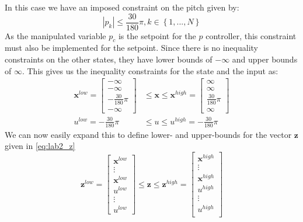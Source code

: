 \documentclass[../main.tex]{subfiles}
\begin{document}
In this case we have an imposed constraint on the pitch given by:
\begin{equation}
	\left\lvert p_k \right\rvert \le \frac{30}{180} \pi, k \in \left\{ 1, ..., N \right\} 
\end{equation}
As the manipulated variable $ p_c $ is the setpoint for the $ p $ controller, this constraint must also be implemented for the setpoint. Since there is no inequality constraints on the other states, they have lower bounds of $ -\infty $ and upper bounds of $ \infty $. This gives us the inequality constraints for the state and the input as: 
\begin{subequations}
	\begin{align}
		\bm x^{low} = \begin{bmatrix}-\infty \\ -\infty \\ -\frac{30}{180} \pi \\ -\infty \end{bmatrix} &\leq \bm x \leq \bm x^{high} = \begin{bmatrix} \infty \\ \infty \\ \frac{30}{180} \pi \\ \infty \end{bmatrix} \\
		u^{low} = -\frac{30}{180} \pi &\leq u \leq u^{high} = -\frac{30}{180} \pi
	\end{align}
\end{subequations}
We can now easily expand this to define lower- and upper-bounds for the vector $ \bm z $ given in \cref{eq:lab2_z}
\begin{equation}\label{eq:lab2_z_bounds}
		\bm z^{low} = \begin{bmatrix}
			\bm x^{low}\\
			\vdots \\
			\bm x^{low}\\
			u^{low}\\
			\vdots \\
			u^{low}
		\end{bmatrix} \leq \bm z \leq
		\bm z^{high} = \begin{bmatrix}
			\bm x^{high}\\
			\vdots\\
			\bm x^{high}\\
			u^{high}\\
			\vdots \\
			u^{high}\\
		\end{bmatrix}
\end{equation}
\end{document}
